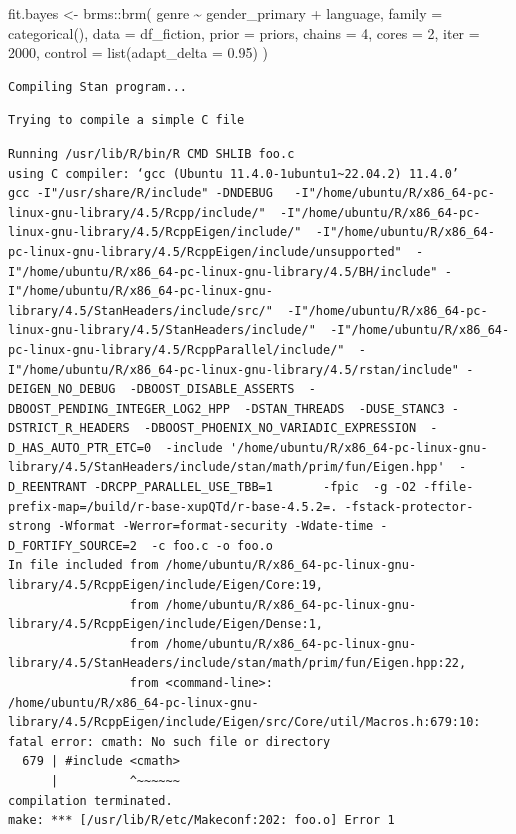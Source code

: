 \documentclass[
  letterpaper,
  DIV=11,
  numbers=noendperiod]{scrartcl}
\newenvironment{Shaded}{\begin{snugshade}}{\end{snugshade}}
\newcommand{\AttributeTok}[1]{\textcolor[rgb]{0.40,0.45,0.13}{#1}}
\newcommand{\DecValTok}[1]{\textcolor[rgb]{0.68,0.00,0.00}{#1}}
\newcommand{\FloatTok}[1]{\textcolor[rgb]{0.68,0.00,0.00}{#1}}
\newcommand{\FunctionTok}[1]{\textcolor[rgb]{0.28,0.35,0.67}{#1}}
\newcommand{\NormalTok}[1]{\textcolor[rgb]{0.00,0.23,0.31}{#1}}
\newcommand{\OtherTok}[1]{\textcolor[rgb]{0.00,0.23,0.31}{#1}}
\newcommand{\SpecialCharTok}[1]{\textcolor[rgb]{0.37,0.37,0.37}{#1}}
\begin{document}
\begin{Shaded}
\begin{Highlighting}[]
\NormalTok{fit.bayes }\OtherTok{\textless{}{-}}\NormalTok{ brms}\SpecialCharTok{::}\FunctionTok{brm}\NormalTok{(}
\NormalTok{  genre }\SpecialCharTok{\textasciitilde{}}\NormalTok{ gender\_primary }\SpecialCharTok{+}\NormalTok{ language,}
  \AttributeTok{family =} \FunctionTok{categorical}\NormalTok{(),}
  \AttributeTok{data =}\NormalTok{ df\_fiction,}
  \AttributeTok{prior =}\NormalTok{ priors,}
  \AttributeTok{chains =} \DecValTok{4}\NormalTok{,}
  \AttributeTok{cores =} \DecValTok{2}\NormalTok{,}
  \AttributeTok{iter =} \DecValTok{2000}\NormalTok{,}
  \AttributeTok{control =} \FunctionTok{list}\NormalTok{(}\AttributeTok{adapt\_delta =} \FloatTok{0.95}\NormalTok{)}
\NormalTok{)}
\end{Highlighting}
\end{Shaded}

\begin{verbatim}
Compiling Stan program...
\end{verbatim}

\begin{verbatim}
Trying to compile a simple C file
\end{verbatim}

\begin{verbatim}
Running /usr/lib/R/bin/R CMD SHLIB foo.c
using C compiler: ‘gcc (Ubuntu 11.4.0-1ubuntu1~22.04.2) 11.4.0’
gcc -I"/usr/share/R/include" -DNDEBUG   -I"/home/ubuntu/R/x86_64-pc-linux-gnu-library/4.5/Rcpp/include/"  -I"/home/ubuntu/R/x86_64-pc-linux-gnu-library/4.5/RcppEigen/include/"  -I"/home/ubuntu/R/x86_64-pc-linux-gnu-library/4.5/RcppEigen/include/unsupported"  -I"/home/ubuntu/R/x86_64-pc-linux-gnu-library/4.5/BH/include" -I"/home/ubuntu/R/x86_64-pc-linux-gnu-library/4.5/StanHeaders/include/src/"  -I"/home/ubuntu/R/x86_64-pc-linux-gnu-library/4.5/StanHeaders/include/"  -I"/home/ubuntu/R/x86_64-pc-linux-gnu-library/4.5/RcppParallel/include/"  -I"/home/ubuntu/R/x86_64-pc-linux-gnu-library/4.5/rstan/include" -DEIGEN_NO_DEBUG  -DBOOST_DISABLE_ASSERTS  -DBOOST_PENDING_INTEGER_LOG2_HPP  -DSTAN_THREADS  -DUSE_STANC3 -DSTRICT_R_HEADERS  -DBOOST_PHOENIX_NO_VARIADIC_EXPRESSION  -D_HAS_AUTO_PTR_ETC=0  -include '/home/ubuntu/R/x86_64-pc-linux-gnu-library/4.5/StanHeaders/include/stan/math/prim/fun/Eigen.hpp'  -D_REENTRANT -DRCPP_PARALLEL_USE_TBB=1       -fpic  -g -O2 -ffile-prefix-map=/build/r-base-xupQTd/r-base-4.5.2=. -fstack-protector-strong -Wformat -Werror=format-security -Wdate-time -D_FORTIFY_SOURCE=2  -c foo.c -o foo.o
In file included from /home/ubuntu/R/x86_64-pc-linux-gnu-library/4.5/RcppEigen/include/Eigen/Core:19,
                 from /home/ubuntu/R/x86_64-pc-linux-gnu-library/4.5/RcppEigen/include/Eigen/Dense:1,
                 from /home/ubuntu/R/x86_64-pc-linux-gnu-library/4.5/StanHeaders/include/stan/math/prim/fun/Eigen.hpp:22,
                 from <command-line>:
/home/ubuntu/R/x86_64-pc-linux-gnu-library/4.5/RcppEigen/include/Eigen/src/Core/util/Macros.h:679:10: fatal error: cmath: No such file or directory
  679 | #include <cmath>
      |          ^~~~~~~
compilation terminated.
make: *** [/usr/lib/R/etc/Makeconf:202: foo.o] Error 1
\end{verbatim}
\end{document}
